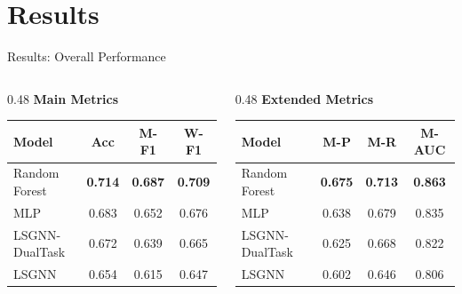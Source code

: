 \documentclass[aspectratio=169, 10pt]{beamer}
\begin{document}
\section{Results}

\begin{frame}{Results: Overall Performance}
\begin{columns}[T]
\begin{column}{0.48\textwidth}
\centering
\textbf{Main Metrics}

\vspace{0.3em}
\small
\begin{tabular}{@{}lccc@{}}
\toprule
\textbf{Model} & \textbf{Acc} & \textbf{M-F1} & \textbf{W-F1} \\
\midrule
Random Forest  & \textbf{0.714} & \textbf{0.687} & \textbf{0.709} \\
MLP            & 0.683          & 0.652          & 0.676 \\
LSGNN-DualTask & 0.672          & 0.639          & 0.665 \\
LSGNN          & 0.654          & 0.615          & 0.647 \\
\bottomrule
\end{tabular}
\end{column}
\begin{column}{0.48\textwidth}
\centering
\textbf{Extended Metrics}

\vspace{0.3em}
\small
\begin{tabular}{@{}lccc@{}}
\toprule
\textbf{Model} & \textbf{M-P} & \textbf{M-R} & \textbf{M-AUC} \\
\midrule
Random Forest  & \textbf{0.675} & \textbf{0.713} & \textbf{0.863} \\
MLP            & 0.638          & 0.679          & 0.835 \\
LSGNN-DualTask & 0.625          & 0.668          & 0.822 \\
LSGNN          & 0.602          & 0.646          & 0.806 \\
\bottomrule
\end{tabular}
\end{column}
\end{columns}

\vspace{0.5cm}


\end{frame}
\end{document}
